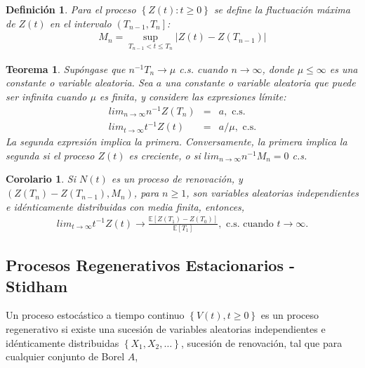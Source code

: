 \documentclass{article}
\newtheorem{Def}{Definición}
\newtheorem{Teo}{Teorema}
\newtheorem{Coro}{Corolario}
\newcommand{\esp}{\mathbb{E}}
\begin{document}
\begin{Def}
Para el proceso $\left\{Z\left(t\right):t\geq0\right\}$ se define la fluctuaci\'on m\'axima de $Z\left(t\right)$ en el intervalo $\left(T_{n-1},T_{n}\right]$:
\begin{eqnarray*}
M_{n}=\sup_{T_{n-1}<t\leq T_{n}}|Z\left(t\right)-Z\left(T_{n-1}\right)|
\end{eqnarray*}
\end{Def}

\begin{Teo}
Sup\'ongase que $n^{-1}T_{n}\rightarrow\mu$ c.s. cuando $n\rightarrow\infty$, donde $\mu\leq\infty$ es una constante o variable aleatoria. Sea $a$ una constante o variable aleatoria que puede ser infinita cuando $\mu$ es finita, y considere las expresiones l\'imite:
\begin{eqnarray}
lim_{n\rightarrow\infty}n^{-1}Z\left(T_{n}\right)&=&a,\textrm{ c.s.}\\
lim_{t\rightarrow\infty}t^{-1}Z\left(t\right)&=&a/\mu,\textrm{ c.s.}
\end{eqnarray}
La segunda expresi\'on implica la primera. Conversamente, la primera implica la segunda si el proceso $Z\left(t\right)$ es creciente, o si $lim_{n\rightarrow\infty}n^{-1}M_{n}=0$ c.s.
\end{Teo}

\begin{Coro}
Si $N\left(t\right)$ es un proceso de renovaci\'on, y $\left(Z\left(T_{n}\right)-Z\left(T_{n-1}\right),M_{n}\right)$, para $n\geq1$, son variables aleatorias independientes e id\'enticamente distribuidas con media finita, entonces,
\begin{eqnarray}
lim_{t\rightarrow\infty}t^{-1}Z\left(t\right)\rightarrow\frac{\esp\left[Z\left(T_{1}\right)-Z\left(T_{0}\right)\right]}{\esp\left[T_{1}\right]},\textrm{ c.s. cuando  }t\rightarrow\infty.
\end{eqnarray}
\end{Coro}


\subsection{Procesos Regenerativos Estacionarios - Stidham \cite{Stidham}}


Un proceso estoc\'astico a tiempo continuo $\left\{V\left(t\right),t\geq0\right\}$ es un proceso regenerativo si existe una sucesi\'on de variables aleatorias independientes e id\'enticamente distribuidas $\left\{X_{1},X_{2},\ldots\right\}$, sucesi\'on de renovaci\'on, tal que para cualquier conjunto de Borel $A$, 
\end{document}
